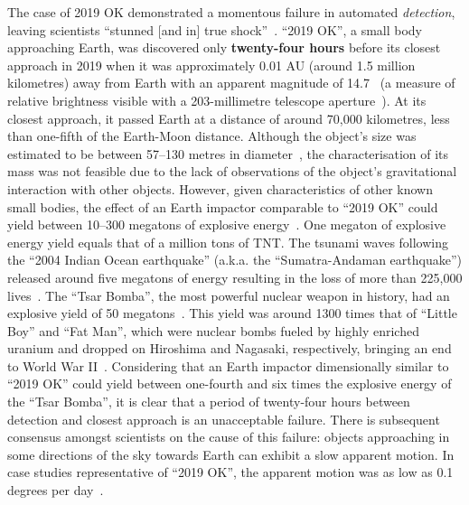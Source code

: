 The case of 2019 OK demonstrated a momentous failure in automated \textit{detection}, leaving scientists ``stunned [and in] true shock''~\cite{chiu_2019}. ``2019 OK'', a small body approaching Earth, was discovered only \textbf{twenty-four hours} before its closest approach in 2019 when it was approximately 0.01 AU (around 1.5 million kilometres) away from Earth with an apparent magnitude of 14.7~\cite{IAU2019OK} (a measure of relative brightness visible with a 203-millimetre telescope aperture~\cite[p.~24]{North2014}). At its closest approach, it passed Earth at a distance of around 70,000 kilometres, less than one-fifth of the Earth-Moon distance. Although the object's size was estimated to be between 57--130 metres in diameter~\cite{NASA2019}, the characterisation of its mass was not feasible due to the lack of observations of the object's gravitational interaction with other objects. However, given characteristics of other known small bodies, the effect of an Earth impactor comparable to ``2019 OK'' could yield between 10--300 megatons of explosive energy~\cite{Cellino1999, Rumpf2017}. One megaton of explosive energy yield equals that of a million tons of \gls{TNT}. The tsunami waves following the ``2004 Indian Ocean earthquake'' (a.k.a. the ``Sumatra-Andaman earthquake'') released around five megatons of energy resulting in the loss of more than 225,000 lives~\cite{Nirupama2006}. The ``Tsar Bomba'', the most powerful nuclear weapon in history, had an explosive yield of 50 megatons~\cite{Khan2020}. This yield was around 1300 times that of ``Little Boy'' and ``Fat Man'', which were nuclear bombs fueled by highly enriched uranium and dropped on Hiroshima and Nagasaki, respectively, bringing an end to World War II~\cite{osti_1489669}. Considering that an Earth impactor dimensionally similar to ``2019 OK'' could yield between one-fourth and six times the explosive energy of the ``Tsar Bomba'', it is clear that a period of twenty-four hours between detection and closest approach is an unacceptable failure. There is subsequent consensus amongst scientists on the cause of this failure: objects approaching in some directions of the sky towards Earth can exhibit a slow apparent motion. In case studies representative of ``2019 OK'', the apparent motion was as low as 0.1 degrees per day~\cite{Wainscoat2022}. 

